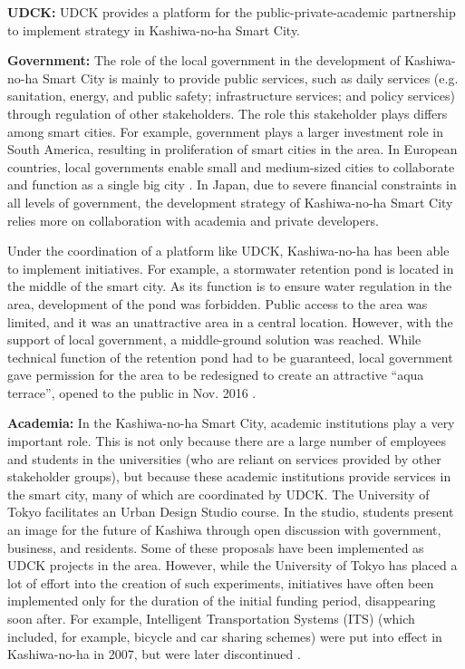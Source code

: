 \documentclass[conference]{IEEEtran}
\begin{document}
\textbf{UDCK:} UDCK provides a platform for the public-private-academic partnership to implement strategy in Kashiwa-no-ha Smart City.

\textbf{Government:} The role of the local government in the development of Kashiwa-no-ha Smart City is mainly to provide public services, such as daily services (e.g. sanitation, energy, and public safety; infrastructure services; and policy services) through regulation of other stakeholders. The role this stakeholder plays differs among smart cities. For example, government plays a larger investment role in South America, resulting in proliferation of smart cities in the area. In European countries, local governments enable small and medium-sized cities to collaborate and function as a single big city \cite{claudel2015government}. In Japan, due to severe financial constraints in all levels of government, the development strategy of Kashiwa-no-ha Smart City relies more on collaboration with academia and private developers.

Under the coordination of a platform like UDCK, Kashiwa-no-ha has been able to implement initiatives. For example, a stormwater retention pond is located in the middle of the smart city. As its function is to ensure water regulation in the area, development of the pond was forbidden. Public access to the area was limited, and it was an unattractive area in a central location. However, with the support of local government, a middle-ground solution was reached. While technical function of the retention pond had to be guaranteed, local government gave permission for the area to be redesigned to create an attractive ``aqua terrace'', opened to the public in Nov. 2016 \cite{mitsui}.

\textbf{Academia:} In the Kashiwa-no-ha Smart City, academic institutions play a very important role. This is not only because there are a large number of employees and students in the universities (who are reliant on services provided by other stakeholder groups), but because these academic institutions provide services in the smart city, many of which are coordinated by UDCK. The University of Tokyo facilitates an Urban Design Studio course. In the studio, students present an image for the future of Kashiwa through open discussion with government, business, and residents. Some of these proposals have been implemented as UDCK projects in the area. However, while the University of Tokyo has placed a lot of effort into the creation of such experiments, initiatives have often been implemented only for the duration of the initial funding period, disappearing soon after. For example, Intelligent Transportation Systems (ITS) (which included, for example, bicycle and car sharing schemes) were put into effect in Kashiwa-no-ha in 2007, but were later discontinued \cite{kashiwanoha}.
\end{document}
